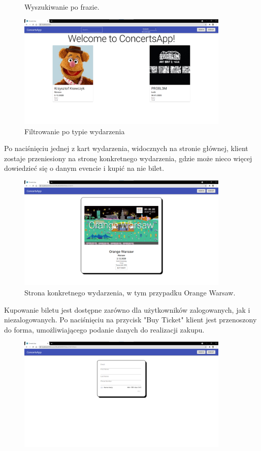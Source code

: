 \documentclass[12pt]{article}
\begin{document}
\begin{sloppypar}
{\begin{figure}[H]
    \caption{Wyszukiwanie po frazie.}
    \label{fig:search-field}
  \end{figure}
  \begin{figure}[H]
    \centering
    \includegraphics[width=0.9\textwidth]{client_app/filter.png}
    \caption{Filtrowanie po typie wydarzenia}
    \label{fig:filter}
  \end{figure}
  Po naciśnięciu jednej z kart wydarzenia, widocznych na stronie głównej, klient zostaje przeniesiony na stronę konkretnego wydarzenia, 
  gdzie może nieco więcej dowiedzieć się o danym evencie i kupić na nie bilet.
  \begin{figure}[H]
    \centering
    \includegraphics[width=0.9\textwidth]{client_app/event.png}
    \caption{Strona konkretnego wydarzenia, w tym przypadku Orange Warsaw.}
    \label{fig:event-page}
  \end{figure} 
  Kupowanie biletu jest dostępne zarówno dla użytkowników zalogowanych, jak i niezalogowanych. 
  Po naciśnięciu na przycisk "Buy Ticket" klient jest przenoszony do forma, umożliwiającego podanie danych do realizacji zakupu.
  \begin{figure}[H]
    \centering
    \includegraphics[width=0.9\textwidth]{client_app/payment_guest.png}

\end{figure}}
\end{sloppypar}
\end{document}
